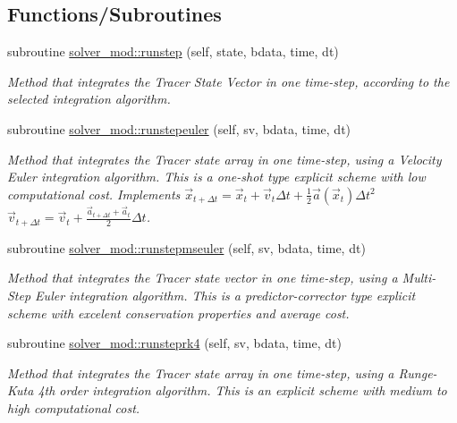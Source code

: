\subsection*{Functions/\+Subroutines}
\begin{DoxyCompactItemize}
\item 
subroutine \mbox{\hyperlink{namespacesolver__mod_a75c5c8b01ae4ae193ff03dbe7e5fc6af}{solver\+\_\+mod\+::runstep}} (self, state, bdata, time, dt)
\begin{DoxyCompactList}\small\item\em Method that integrates the Tracer State Vector in one time-\/step, according to the selected integration algorithm. \end{DoxyCompactList}\item 
subroutine \mbox{\hyperlink{namespacesolver__mod_a21533e195501ebb46c1814aeaede4c55}{solver\+\_\+mod\+::runstepeuler}} (self, sv, bdata, time, dt)
\begin{DoxyCompactList}\small\item\em Method that integrates the Tracer state array in one time-\/step, using a Velocity Euler integration algorithm. This is a one-\/shot type explicit scheme with low computational cost. Implements $ {\vec {x}}_{t+\Delta t}={\vec {x}}_{t}+{\vec {v}}_{t}\Delta t+{\frac {1}{2}}{\vec {a}}({\vec {x}}_{t})\Delta t^{2}$ $ {\vec {v}}_{t+\Delta t}={\vec {v}}_{t}+\frac{{\vec {a}}_{t+\Delta t}+{\vec {a}}_{t}}{2}\Delta t$. \end{DoxyCompactList}\item 
subroutine \mbox{\hyperlink{namespacesolver__mod_ae574f8d772b89d5c3c602db278c05325}{solver\+\_\+mod\+::runstepmseuler}} (self, sv, bdata, time, dt)
\begin{DoxyCompactList}\small\item\em Method that integrates the Tracer state vector in one time-\/step, using a Multi-\/\+Step Euler integration algorithm. This is a predictor-\/corrector type explicit scheme with excelent conservation properties and average cost. \end{DoxyCompactList}\item 
subroutine \mbox{\hyperlink{namespacesolver__mod_a11436fc89bf6c713930a83b5cc52a0cd}{solver\+\_\+mod\+::runsteprk4}} (self, sv, bdata, time, dt)
\begin{DoxyCompactList}\small\item\em Method that integrates the Tracer state array in one time-\/step, using a Runge-\/\+Kuta 4th order integration algorithm. This is an explicit scheme with medium to high computational cost. \end{DoxyCompactList}\item 

\end{DoxyCompactItemize}
